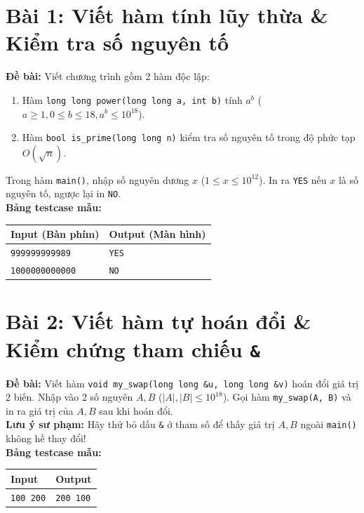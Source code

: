 \documentclass[11pt,a4paper]{article}
\begin{document}
\section*{\color{AsianDarkBlue}Bài 1: Viết hàm tính lũy thừa \& Kiểm tra số nguyên tố}
\textbf{Đề bài:} Viết chương trình gồm 2 hàm độc lập:
\begin{enumerate}
    \setlength{\itemsep}{1pt}
    \item Hàm \texttt{long long power(long long a, int b)} tính $a^b$ ($a \ge 1, 0 \le b \le 18, a^b \le 10^{18}$).
    \item Hàm \texttt{bool is\_prime(long long n)} kiểm tra số nguyên tố trong độ phức tạp $O(\sqrt{n})$.
\end{enumerate}
Trong hàm \texttt{main()}, nhập số nguyên dương $x$ ($1 \le x \le 10^{12}$). In ra \texttt{YES} nếu $x$ là số nguyên tố, ngược lại in \texttt{NO}.\\
\textbf{Bảng testcase mẫu:}
\begin{table}[h!]
\centering\small
\begin{tabular}{|p{7.5cm}|p{7.5cm}|}
\hline
\textbf{Input (Bàn phím)} & \textbf{Output (Màn hình)} \\ \hline
\texttt{999999999989} & \texttt{YES} \\ \hline
\texttt{1000000000000} & \texttt{NO} \\ \hline
\end{tabular}
\end{table}

\section*{\color{AsianDarkBlue}Bài 2: Viết hàm tự hoán đổi \& Kiểm chứng tham chiếu \texttt{\&}}
\textbf{Đề bài:} Viết hàm \texttt{void my\_swap(long long \&u, long long \&v)} hoán đổi giá trị 2 biến. Nhập vào 2 số nguyên $A, B$ ($|A|, |B| \le 10^{18}$). Gọi hàm \texttt{my\_swap(A, B)} và in ra giá trị của $A, B$ sau khi hoán đổi.\\
\textbf{Lưu ý sư phạm:} Hãy thử bỏ dấu \texttt{\&} ở tham số để thấy giá trị $A, B$ ngoài \texttt{main()} không hề thay đổi!\\
\textbf{Bảng testcase mẫu:}
\begin{table}[h!]
\centering\small
\begin{tabular}{|p{7.5cm}|p{7.5cm}|}
\hline
\textbf{Input} & \textbf{Output} \\ \hline
\texttt{100 200} & \texttt{200 100} \\ \hline
\end{tabular}
\end{table}
\end{document}
